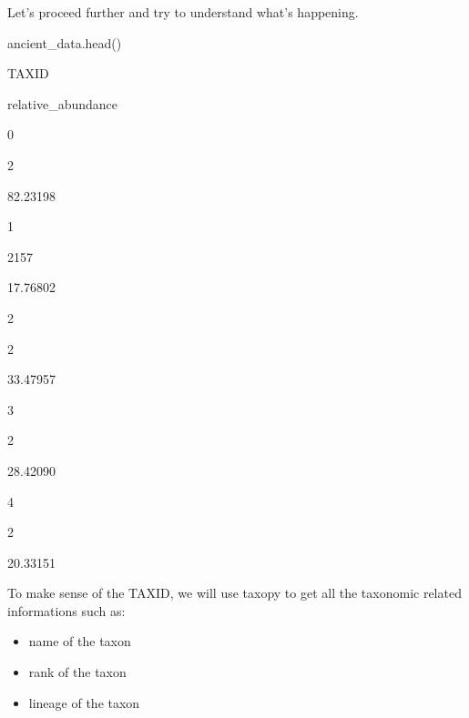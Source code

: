 \documentclass[
  letterpaper,
]{book}
\newenvironment{Shaded}{}{}
\newcommand{\NormalTok}[1]{\textcolor[rgb]{0.14,0.16,0.18}{#1}}
\providecommand{\tightlist}{%
  \setlength{\itemsep}{0pt}\setlength{\parskip}{0pt}}\usepackage{longtable,booktabs,array}
\begin{document}
Let's proceed further and try to understand what's happening.

\begin{Shaded}
\begin{Highlighting}[]
\NormalTok{ancient\_data.head()}
\end{Highlighting}
\end{Shaded}

TAXID

relative\_abundance

0

2

82.23198

1

2157

17.76802

2

2

33.47957

3

2

28.42090

4

2

20.33151

To make sense of the TAXID, we will use taxopy to get all the taxonomic
related informations such as:

\begin{itemize}
\tightlist
\item
  name of the taxon
\item
  rank of the taxon
\item
  lineage of the taxon
\end{itemize}
\end{document}
